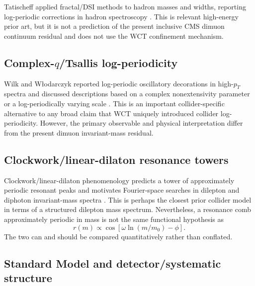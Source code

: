 \documentclass[11pt]{article}
\begin{document}
Tatischeff applied fractal/DSI methods to hadron masses and widths, reporting
log-periodic corrections in hadron spectroscopy \cite{Tatischeff2011}.  This
is relevant high-energy prior art, but it is not a prediction of the present
inclusive CMS dimuon continuum residual and does not use the WCT confinement
mechanism.

\subsection{Complex-\(q\)/Tsallis log-periodicity}

Wilk and W{\l}odarczyk reported log-periodic oscillatory decorations in
high-\(p_T\) spectra and discussed descriptions based on a complex
nonextensivity parameter or a log-periodically varying scale
\cite{Wilk2014,Wilk2015}.  This is an important collider-specific alternative
to any broad claim that WCT uniquely introduced collider log-periodicity.
However, the primary observable and physical interpretation differ from the
present dimuon invariant-mass residual.

\subsection{Clockwork/linear-dilaton resonance towers}

Clockwork/linear-dilaton phenomenology predicts a tower of approximately
periodic resonant peaks and motivates Fourier-space searches in dilepton and
diphoton invariant-mass spectra \cite{Giudice2018}.  This is perhaps the
closest prior collider model in terms of a structured dilepton mass spectrum.
Nevertheless, a resonance comb approximately periodic in mass is not the same
functional hypothesis as
\begin{equation}
r(m)\propto
\cos\!\left[\omega\ln(m/m_0)-\phi\right].
\end{equation}
The two can and should be compared quantitatively rather than conflated.

\subsection{Standard Model and detector/systematic structure}
\end{document}
